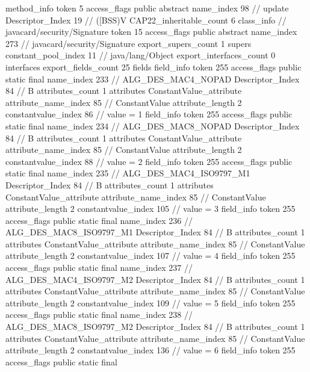{{{{{				}
				method_info {
					token	5
					access_flags	public abstract
					name_index	98		// update
					Descriptor_Index	19		// ([BSS)V
				}
			}
			CAP22_inheritable_count	6
		}
		class_info {		// javacard/security/Signature
			token	15
			access_flags	public abstract
			name_index	273		// javacard/security/Signature
			export_supers_count	1
			supers {
				constant_pool_index	11		// java/lang/Object
			}
			export_interfaces_count	0
			interfaces {
			}
			export_fields_count	25
			fields {
			field_info {
				token	255
				access_flags	public static final
				name_index	233		// ALG_DES_MAC4_NOPAD
				Descriptor_Index	84		// B
				attributes_count	1
				attributes {
				ConstantValue_attribute {
					attribute_name_index	85		// ConstantValue
					attribute_length	2
					constantvalue_index	86		// value = 1
				}
				}
			}
			field_info {
				token	255
				access_flags	public static final
				name_index	234		// ALG_DES_MAC8_NOPAD
				Descriptor_Index	84		// B
				attributes_count	1
				attributes {
				ConstantValue_attribute {
					attribute_name_index	85		// ConstantValue
					attribute_length	2
					constantvalue_index	88		// value = 2
				}
				}
			}
			field_info {
				token	255
				access_flags	public static final
				name_index	235		// ALG_DES_MAC4_ISO9797_M1
				Descriptor_Index	84		// B
				attributes_count	1
				attributes {
				ConstantValue_attribute {
					attribute_name_index	85		// ConstantValue
					attribute_length	2
					constantvalue_index	105		// value = 3
				}
				}
			}
			field_info {
				token	255
				access_flags	public static final
				name_index	236		// ALG_DES_MAC8_ISO9797_M1
				Descriptor_Index	84		// B
				attributes_count	1
				attributes {
				ConstantValue_attribute {
					attribute_name_index	85		// ConstantValue
					attribute_length	2
					constantvalue_index	107		// value = 4
				}
				}
			}
			field_info {
				token	255
				access_flags	public static final
				name_index	237		// ALG_DES_MAC4_ISO9797_M2
				Descriptor_Index	84		// B
				attributes_count	1
				attributes {
				ConstantValue_attribute {
					attribute_name_index	85		// ConstantValue
					attribute_length	2
					constantvalue_index	109		// value = 5
				}
				}
			}
			field_info {
				token	255
				access_flags	public static final
				name_index	238		// ALG_DES_MAC8_ISO9797_M2
				Descriptor_Index	84		// B
				attributes_count	1
				attributes {
				ConstantValue_attribute {
					attribute_name_index	85		// ConstantValue
					attribute_length	2
					constantvalue_index	136		// value = 6
				}
				}
			}
			field_info {
				token	255
				access_flags	public static final
}}}}}
